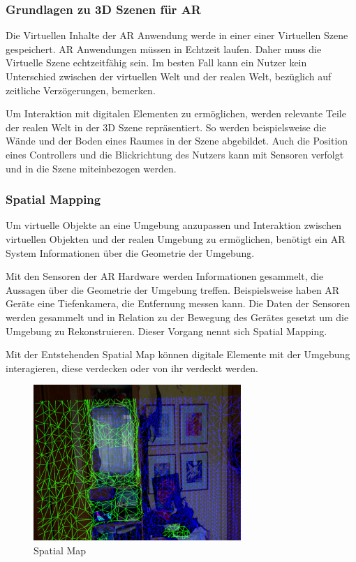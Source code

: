 
\subsubsection{Grundlagen zu 3D Szenen für AR}



Die Virtuellen Inhalte der AR Anwendung werde in einer einer Virtuellen Szene gespeichert. 
AR Anwendungen müssen in Echtzeit laufen. Daher muss die Virtuelle Szene echtzeitfähig sein.
Im besten Fall kann ein Nutzer kein Unterschied zwischen der virtuellen Welt und der realen Welt, bezüglich auf zeitliche Verzögerungen, bemerken.

Um Interaktion mit digitalen Elementen zu ermöglichen, werden relevante Teile der realen Welt in der 3D Szene repräsentiert. 
So werden beispielsweise die Wände und der Boden eines Raumes in der Szene abgebildet. Auch die Position eines Controllers und die Blickrichtung des Nutzers kann mit Sensoren verfolgt und in die Szene miteinbezogen werden.

\subsubsection{Spatial Mapping} 
Um virtuelle Objekte an eine Umgebung anzupassen und Interaktion zwischen virtuellen Objekten und der realen Umgebung zu ermöglichen, benötigt ein AR System Informationen über die Geometrie der Umgebung.

Mit den Sensoren der AR Hardware werden Informationen gesammelt, die Aussagen über die Geometrie der Umgebung treffen. Beispielsweise haben AR Geräte eine Tiefenkamera, die Entfernung messen kann. Die Daten der Sensoren werden gesammelt und in Relation zu der Bewegung des Gerätes gesetzt um die Umgebung zu Rekonstruieren. Dieser Vorgang nennt sich Spatial Mapping. 

Mit der Entstehenden Spatial Map können digitale Elemente mit der Umgebung interagieren, diese verdecken oder von ihr verdeckt werden.\citep{spatialMapping} 

\begin{figure}[H]
	\centering
	\includegraphics[width=0.7\textwidth]{images/ML_20201003_15.36.42.jpg}
	\caption[]{Spatial Map}
	\label{img:spatialmap}
\end{figure}

